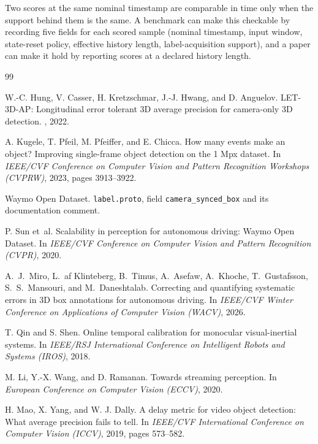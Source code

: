 \documentclass[10pt,twocolumn,letterpaper]{article}
\begin{document}
Two scores at the same nominal timestamp are comparable in time only when the support behind them is the same. A benchmark can make this checkable by recording five fields for each scored sample (nominal timestamp, input window, state-reset policy, effective history length, label-acquisition support), and a paper can make it hold by reporting scores at a declared history length.
{\footnotesize
\setlength{\itemsep}{0.4pt}
\clearpage
\begin{thebibliography}{99}

W.-C. Hung, V. Casser, H. Kretzschmar, J.-J. Hwang, and D. Anguelov.
\newblock LET-3D-AP: Longitudinal error tolerant 3D average precision for
camera-only 3D detection.
, 2022.

A. Kugele, T. Pfeil, M. Pfeiffer, and E. Chicca.
\newblock How many events make an object? Improving single-frame object detection on the 1 Mpx dataset.
\newblock In {\em IEEE/CVF Conference on Computer Vision and Pattern Recognition Workshops (CVPRW)}, 2023, pages 3913--3922.

Waymo Open Dataset.
\newblock \texttt{label.proto}, field \texttt{camera\_synced\_box} and its
documentation comment.

P. Sun et~al.
\newblock Scalability in perception for autonomous driving: Waymo Open Dataset.
\newblock In {\em IEEE/CVF Conference on Computer Vision and Pattern Recognition
(CVPR)}, 2020.

A.~J.~Miro, L.~af Klinteberg, B.~Timus, A.~Asefaw, A.~Khoche, T.~Gustafsson,
S.~S.~Mansouri, and M.~Daneshtalab.
\newblock Correcting and quantifying systematic errors in 3D box annotations for
autonomous driving.
\newblock In {\em IEEE/CVF Winter Conference on Applications of Computer Vision
(WACV)}, 2026.

T. Qin and S. Shen.
\newblock Online temporal calibration for monocular visual-inertial systems.
\newblock In {\em IEEE/RSJ International Conference on Intelligent Robots and
Systems (IROS)}, 2018.

M. Li, Y.-X. Wang, and D. Ramanan.
\newblock Towards streaming perception.
\newblock In {\em European Conference on Computer Vision (ECCV)}, 2020.

H. Mao, X. Yang, and W. J. Dally.
\newblock A delay metric for video object detection: What average precision
fails to tell.
\newblock In {\em IEEE/CVF International Conference on Computer Vision (ICCV)},
2019, pages 573--582.


\end{thebibliography}}
\end{document}
